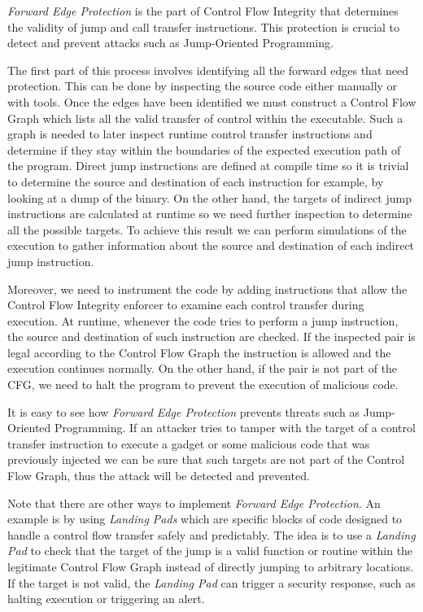 \textit{Forward Edge Protection} is the part of Control Flow Integrity that
determines the validity of jump and call transfer instructions. This protection is
crucial to detect and prevent attacks such as Jump-Oriented Programming.

The first part of this process involves identifying all the forward edges that need
protection. This can be done by inspecting the source code either manually or
with tools. Once the edges have been identified we must construct a Control Flow
Graph which lists all the valid transfer of control within the executable. Such
a graph is needed to later inspect runtime control transfer instructions and
determine if they stay within the boundaries of the expected execution path of
the program. Direct jump instructions are defined at compile time so it is trivial
to determine the source and destination of each instruction for example, by
looking at a dump of the binary. On the other hand, the targets of indirect jump
instructions are calculated at runtime so we need further inspection to
determine all the possible targets. To achieve this result we can perform simulations
of the execution to gather information about the source and destination of each indirect
jump instruction.

Moreover, we need to instrument the code by adding instructions that allow the
Control Flow Integrity enforcer to examine each control transfer during
execution. At runtime, whenever the code tries to perform a jump instruction, the
source and destination of such instruction are checked. If the inspected pair is
legal according to the Control Flow Graph the instruction is allowed and the
execution continues normally. On the other hand, if the pair is not part of the
CFG, we need to halt the program to prevent the execution of malicious code.

It is easy to see how \textit{Forward Edge Protection} prevents threats such as
Jump-Oriented Programming. If an attacker tries to tamper with the target of a control
transfer instruction to execute a gadget or some malicious code that was previously
injected we can be sure that such targets are not part of the Control Flow Graph,
thus the attack will be detected and prevented.

Note that there are other ways to implement \textit{Forward Edge Protection}. An
example is by using \textit{Landing Pads} which are specific blocks of code designed
to handle a control flow transfer safely and predictably. The idea is to use a
\textit{Landing Pad} to check that the target of the jump is a valid function or
routine within the legitimate Control Flow Graph instead of directly jumping to arbitrary
locations. If the target is not valid, the \textit{Landing Pad} can trigger a
security response, such as halting execution or triggering an alert.

